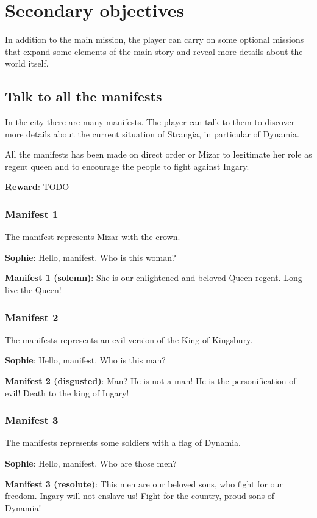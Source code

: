 \section{Secondary objectives}
In addition to the main mission, the player can carry on some optional missions that expand some elements of the main story and reveal more details about the world itself.

\subsection{Talk to all the manifests}
In the city there are many manifests. The player can talk to them to discover more details about the current situation of Strangia, in particular of Dynamia.

All the manifests has been made on direct order or Mizar to legitimate her role as regent queen and to encourage the people to fight against Ingary.

\textbf{Reward}: TODO

\subsubsection*{Manifest 1}
The manifest represents Mizar with the crown.

\textbf{Sophie}: Hello, manifest. Who is this woman?

\textbf{Manifest 1 (solemn)}: She is our enlightened and beloved Queen regent. Long live the Queen!

\subsubsection*{Manifest 2}
The manifests represents an evil version of the King of Kingsbury.

\textbf{Sophie}: Hello, manifest. Who is this man?

\textbf{Manifest 2 (disgusted)}: Man? He is not a man! He is the personification of evil! Death to the king of Ingary!

\subsubsection*{Manifest 3}
The manifests represents some soldiers with a flag of Dynamia.

\textbf{Sophie}: Hello, manifest. Who are those men?

\textbf{Manifest 3 (resolute)}: This men are our beloved sons, who fight for our freedom. Ingary will not enslave us! Fight for the country, proud sons of Dynamia!

